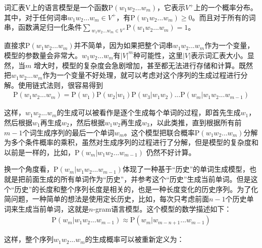 \vspace{0.5em}
\begin{definition}[]
词汇表V上的语言模型是一个函数$\textrm{P}(w_1 w_2...w_m)$，它表示$V^+$上的一个概率分布。其中，对于任何词串$w_1 w_2...w_m\in{V^+}$，有$\textrm{P}(w_1 w_2...w_m)\geq{0}$。而且对于所有的词串，函数满足归一化条件$\sum{_{w_1 w_2...w_m\in{V^+}}\textrm{P}(w_1 w_2...w_m)}=1$。
\end{definition}

\parinterval 直接求$\textrm{P}(w_1 w_2...w_m)$并不简单，因为如果把整个词串$w_1 w_2...w_m$作为一个变量，模型的参数量会非常大。$w_1 w_2...w_m$有$|V|^m$种可能性，这里$|V|$表示词汇表大小。显然，当$m$ 增大时，模型的复杂度会急剧增加，甚至都无法进行存储和计算。既然把$w_1 w_2...w_m$作为一个变量不好处理，就可以考虑对这个序列的生成过程进行分解。使用链式法则，很容易得到
\begin{eqnarray}
\textrm{P}(w_1 w_2...w_m)=\textrm{P}(w_1)\textrm{P}(w_2|w_1)\textrm{P}(w_3|w_1 w_2)...\textrm{P}(w_m|w_1 w_2...w_{m-1})
\label{eq:2-22}
\end{eqnarray}

这样，$w_1 w_2...w_m$的生成可以被看作是逐个生成每个单词的过程，即首先生成$w_1$，然后根据$w_1$再生成$w_2$，然后根据$w_1 w_2$再生成$w_3$，以此类推，直到根据所有前$m-1$个词生成序列的最后一个单词$w_m$。这个模型把联合概率$\textrm{P}(w_1 w_2...w_m)$分解为多个条件概率的乘积，虽然对生成序列的过程进行了分解，但是模型的复杂度和以前是一样的，比如，$\textrm{P}(w_m|w_1 w_2...w_{m-1})$ 仍然不好计算。

\parinterval 换一个角度看，$\textrm{P}(w_m|w_1 w_2...w_{m-1})$体现了一种基于``历史''的单词生成模型，也就是把前面生成的所有单词作为``历史''，并参考这个``历史''生成当前单词。但是这个``历史''的长度和整个序列长度是相关的，也是一种长度变化的历史序列。为了化简问题，一种简单的想法是使用定长历史，比如，每次只考虑前面$n-1$个历史单词来生成当前单词，这就是$n$-gram语言模型。这个模型的数学描述如下：
\begin{eqnarray}
\textrm{P}(w_m|w_1 w_2...w_{m-1}) \approx \textrm{P}(w_m|w_{m-n+1}...w_{m-1})
\label{eq:2-23}
\end{eqnarray}

\parinterval 这样，整个序列$w_1 w_2...w_m$的生成概率可以被重新定义为：\\ \\ \\

